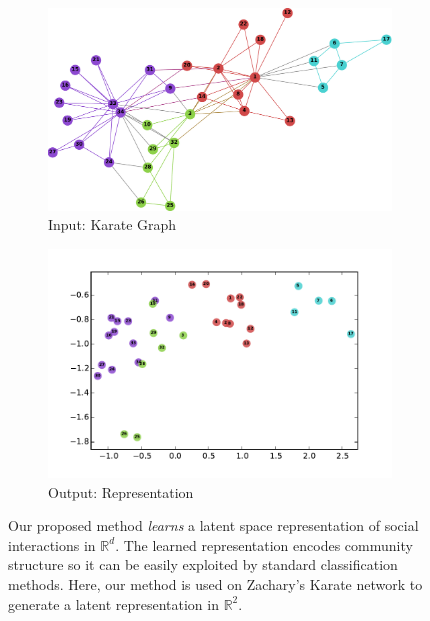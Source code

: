 \documentclass{sig-alternate}
\begin{document}
\begin{figure}[t!]
	\centering
        \begin{subfigure}[b]{0.48\columnwidth}
                \includegraphics[width=\columnwidth]{figures/karate_graph.pdf}
                \caption{Input: Karate Graph}
                \label{fig:toy_example_graph}
        \end{subfigure}
        \begin{subfigure}[b]{0.48\columnwidth}
                \includegraphics[width=\columnwidth]{figures/karate.pdf}
                \caption{Output: Representation}
                \label{fig:toy_example_embedding}
        \end{subfigure}
        \caption{Our proposed method \emph{learns} a latent space representation of social interactions in $\mathbb{R}^d$.  The learned representation encodes community structure so it can be easily exploited by standard classification methods. Here, our method is used on Zachary's Karate network \cite{zachary1977information} to generate a latent representation in $\mathbb{R}^2$.  
}
\end{figure}
\end{document}
